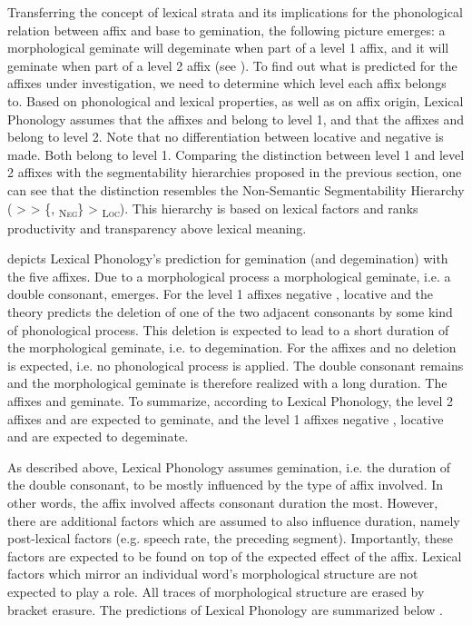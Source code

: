 Transferring the concept of lexical strata and its implications for the phonological relation between affix and base to gemination, the following picture emerges: a morphological geminate will degeminate when part of a level 1 affix, and it will geminate when part of a level 2 affix (see \citealt[18]{Mohanan.1986}). To find out what is predicted for the affixes under investigation, we need to determine which level each affix belongs to. 
Based on phonological and lexical properties, as well as on affix origin, Lexical Phonology assumes that the affixes  and  belong to level 1, and that the affixes  and  belong to level 2. Note that no differentiation between locative and negative  is made. Both belong to level 1.
Comparing the distinction between level 1 and level 2 affixes with the segmentability hierarchies proposed in the previous section, one can see that the distinction resembles the Non-Semantic Segmentability Hierarchy ( >  > \{, \textsubscript{\textsc{Neg}}\} >  \textsubscript{\textsc{Loc}}). This hierarchy is based on lexical factors and ranks productivity and transparency above lexical meaning.  


 depicts Lexical Phonology's prediction for gemination (and degemination) with the five affixes. Due to a morphological process a morphological geminate, i.e. a double consonant, emerges. For the level 1 affixes negative , locative  and  the theory predicts the deletion of one of the two adjacent consonants by some kind of phonological process. This deletion is expected to lead to a short duration of the morphological geminate, i.e. to degemination. For the affixes  and  no deletion is expected, i.e. no phonological process is applied. The double consonant remains and the morphological geminate is therefore realized with a long duration. The affixes  and  geminate.  
To summarize, according to Lexical Phonology, the level 2 affixes  and  are expected to geminate, and the level 1 affixes negative , locative  and  are expected to degeminate. 

As described above, Lexical Phonology assumes gemination, i.e. the duration of the double consonant, to be mostly influenced by the type of affix involved. In other words, the affix involved affects consonant duration the most. However, there are additional factors which are assumed to also influence duration, namely post-lexical factors (e.g. speech rate, the preceding segment). Importantly, these factors are expected to be found on top of the expected effect of the affix. Lexical factors which mirror an individual word's morphological structure are not expected to play a role. All traces of morphological structure are erased by bracket erasure. 
The predictions of Lexical Phonology are summarized below .



